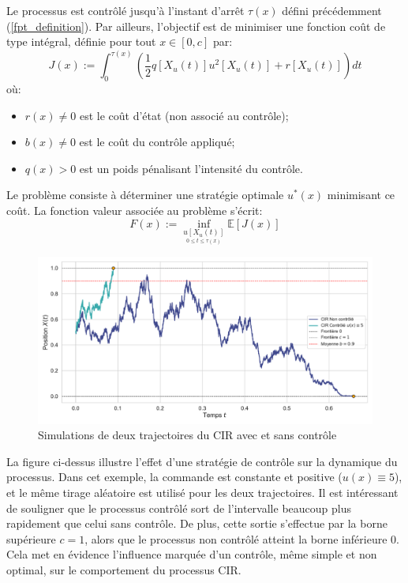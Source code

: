 Le processus est contrôlé jusqu'à l'instant d'arrêt $\tau(x)$ défini précédemment (\ref{fpt_definition}).
Par ailleurs, l'objectif est de minimiser une fonction coût de type intégral, définie pour tout \(x\in[0,c]\) par:
\begin{equation}\label{cost_function}
    J(x) := \int_0^{\tau(x)} \left( \frac{1}{2}q[X_u(t)]u^2[X_u(t)] + r[X_u(t)] \right) dt
\end{equation}
où:
\begin{itemize}
    \item \( r(x) \neq 0 \) est le coût d'état (non associé au contrôle);
    \item \( b(x) \neq 0 \) est le coût du contrôle appliqué;
    \item \( q(x) > 0 \) est un poids pénalisant l'intensité du contrôle.
\end{itemize}
Le problème consiste à déterminer une stratégie optimale \( u^*(x) \) minimisant ce coût. La fonction valeur associée au problème s'écrit:
\begin{equation}\label{value_function}
    F(x) := \inf_{\underset{0 \leq t \leq \tau(x)}{u[X_u(t)]}} \mathds{E}[J(x)]
\end{equation}
\begin{figure}[htb]
    \centering
    \includegraphics[width=0.9\linewidth]{img/intro/control.pdf}
    \caption{Simulations de deux trajectoires du CIR avec et sans contrôle}\label{fig:ControlViz}
\end{figure}
\FloatBarrier La figure ci-dessus illustre l'effet d'une stratégie de contrôle sur la dynamique du processus. Dans cet exemple, la commande est constante et positive ($u(x)\equiv5$), et le même tirage aléatoire est utilisé pour les deux trajectoires. Il est intéressant de souligner que le processus contrôlé sort de l'intervalle beaucoup plus rapidement que celui sans contrôle. De plus, cette sortie s'effectue par la borne supérieure \(c = 1\), alors que le processus non contrôlé atteint la borne inférieure 0. Cela met en évidence l'influence marquée d'un contrôle, même simple et non optimal, sur le comportement du processus \acs{CIR}.



